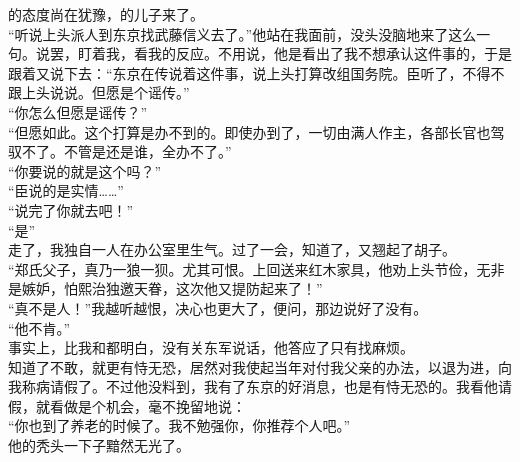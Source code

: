 的态度尚在犹豫，的儿子来了。\\

“听说上头派人到东京找武藤信义去了。”他站在我面前，没头没脑地来了这么一句。说罢，盯着我，看我的反应。不用说，他是看出了我不想承认这件事的，于是跟着又说下去：“东京在传说着这件事，说上头打算改组国务院。臣听了，不得不跟上头说说。但愿是个谣传。”\\

“你怎么但愿是谣传？”\\

“但愿如此。这个打算是办不到的。即使办到了，一切由满人作主，各部长官也驾驭不了。不管是还是谁，全办不了。”\\

“你要说的就是这个吗？”\\

“臣说的是实情……”\\

“说完了你就去吧！”\\

“是”\\

走了，我独自一人在办公室里生气。过了一会，知道了，又翘起了胡子。\\

“郑氏父子，真乃一狼一狈。尤其可恨。上回送来红木家具，他劝上头节俭，无非是嫉妒，怕熙治独邀天眷，这次他又提防起来了！”\\

“真不是人！”我越听越恨，决心也更大了，便问，那边说好了没有。\\

“他不肯。”\\

事实上，比我和都明白，没有关东军说话，他答应了只有找麻烦。\\

知道了不敢，就更有恃无恐，居然对我使起当年对付我父亲的办法，以退为进，向我称病请假了。不过他没料到，我有了东京的好消息，也是有恃无恐的。我看他请假，就看做是个机会，毫不挽留地说：\\

“你也到了养老的时候了。我不勉强你，你推荐个人吧。”\\

他的秃头一下子黯然无光了。\\

